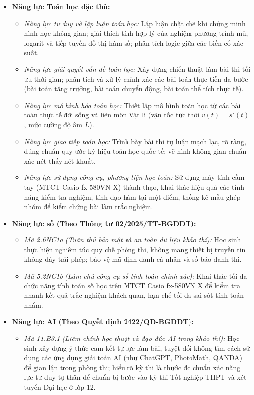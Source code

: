 \documentclass[12pt, a4paper]{article}
\begin{document}
\begin{itemize}[leftmargin=1.2cm]
    \item \textbf{Năng lực Toán học đặc thù:}
    \begin{itemize}[leftmargin=0.6cm]
        \item \textit{Năng lực tư duy và lập luận toán học:} Lập luận chặt chẽ khi chứng minh hình học không gian; giải thích tính hợp lý của nghiệm phương trình mũ, logarit và tiếp tuyến đồ thị hàm số; phân tích logic giữa các biến cố xác suất.
        \item \textit{Năng lực giải quyết vấn đề toán học:} Xây dựng chiến thuật làm bài thi tối ưu thời gian; phân tích và xử lý chính xác các bài toán thực tiễn đa bước (bài toán tăng trưởng, bài toán chuyển động, bài toán thể tích thực tế).
        \item \textit{Năng lực mô hình hóa toán học:} Thiết lập mô hình toán học từ các bài toán thực tế đời sống và liên môn Vật lí (vận tốc tức thời $v(t) = s'(t)$, mức cường độ âm $L$).
        \item \textit{Năng lực giao tiếp toán học:} Trình bày bài thi tự luận mạch lạc, rõ ràng, đúng chuẩn quy ước ký hiệu toán học quốc tế; vẽ hình không gian chuẩn xác nét thấy nét khuất.
        \item \textit{Năng lực sử dụng công cụ, phương tiện học toán:} Sử dụng máy tính cầm tay (MTCT Casio fx-580VN X) thành thạo, khai thác hiệu quả các tính năng kiểm tra nghiệm, tính đạo hàm tại một điểm, thống kê mẫu ghép nhóm để kiểm chứng bài làm trắc nghiệm.
    \end{itemize}

    \item \textbf{Năng lực số (Theo Thông tư 02/2025/TT-BGDĐT):}
    \begin{itemize}[leftmargin=0.6cm]
        \item \textit{Mã 2.6NC1a (Tuân thủ bảo mật và an toàn dữ liệu khảo thí):} Học sinh thực hiện nghiêm túc quy chế phòng thi, không mang thiết bị truyền tin không dây trái phép; bảo vệ mã định danh cá nhân và số báo danh thi.
        \item \textit{Mã 5.2NC1b (Làm chủ công cụ số tính toán chính xác):} Khai thác tối đa chức năng tính toán số học trên MTCT Casio fx-580VN X để kiểm tra nhanh kết quả trắc nghiệm khách quan, hạn chế tối đa sai sót tính toán nhẩm.
    \end{itemize}

    \item \textbf{Năng lực AI (Theo Quyết định 2422/QĐ-BGDĐT):}
    \begin{itemize}[leftmargin=0.6cm]
        \item \textit{Mã 11.B3.1 (Liêm chính học thuật và đạo đức AI trong khảo thí):} Học sinh xây dựng ý thức cam kết tự lực làm bài, tuyệt đối không tìm cách sử dụng các ứng dụng giải toán AI (như ChatGPT, PhotoMath, QANDA) để gian lận trong phòng thi; hiểu rõ kỳ thi là thước đo chuẩn xác năng lực tư duy tự thân để chuẩn bị bước vào kỳ thi Tốt nghiệp THPT và xét tuyển Đại học ở lớp 12.
    \end{itemize}


\end{itemize}
\end{document}

